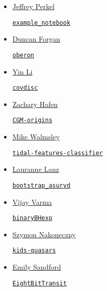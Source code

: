 \documentclass[11pt,a4paper]{article}
\begin{document}
\begin{itemize}
\item \href{https://github.com/jperkel/}{Jeffrey Perkel}
  \begin{itemize}
    \href{https://github.com/jperkel/example_notebook}{\tt example\_notebook}
  \end{itemize}

\item \href{https://github.com/dh4gan/}{Duncan Forgan}
  \begin{itemize}
    \href{https://github.com/dh4gan/oberon}{\tt oberon}
  \end{itemize}

\item \href{https://github.com/eelregit/}{Yin Li} 
  \begin{itemize}
    \href{https://github.com/eelregit/covdisc}{\tt covdisc}
  \end{itemize}

\item \href{https://github.com/zhafen/}{Zachary Hafen} 
  \begin{itemize}
    \href{https://github.com/zhafen/CGM-origins}{\tt CGM-origins}
  \end{itemize}

\item \href{https://github.com/mwalmsley/}{Mike Walmsley} 
  \begin{itemize}
    \href{https://github.com/mwalmsley/tidal-features-classifier}{\tt tidal-features-classifier} 
\end{itemize}

\item \href{https://github.com/lalanz/}{Lauranne Lanz}
  \begin{itemize}
    \href{https://github.com/lalanz/bootstrap\_asurv}{\tt bootstrap\_asurvd}
  \end{itemize}

\item \href{https://github.com/vijayvarma392}{Vijay Varma}
  \begin{itemize}
    \href{https://github.com/vijayvarma392/binaryBHexp}{\tt binaryBHexp}
  \end{itemize}

\item \href{https://github.com/snakoneczny}{Szymon Nakoneczny}
  \begin{itemize}
    \href{https://github.com/snakoneczny/kids-quasars}{\tt kids-quasars}
  \end{itemize}

\item \href{https://github.com/esandford}{Emily Sandford}
  \begin{itemize}
    \href{https://github.com/esandford/EightBitTransit}{\tt EightBitTransit}
  \end{itemize}


\end{itemize}
\end{document}
